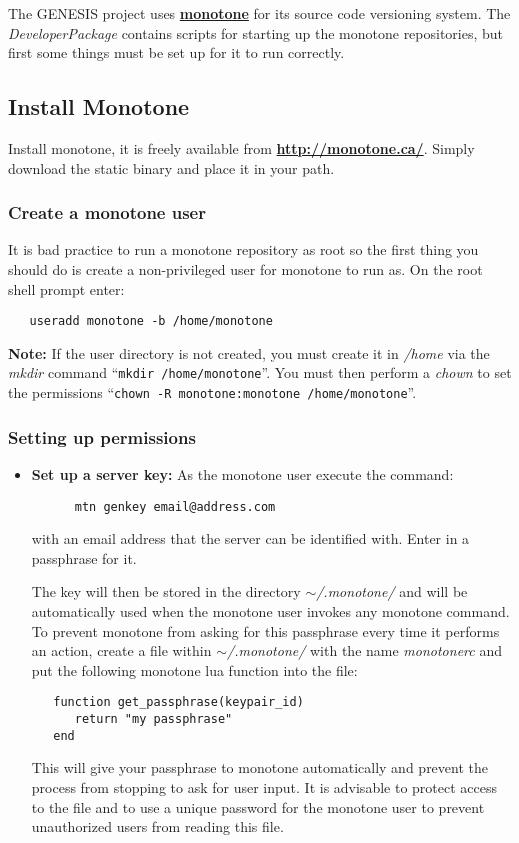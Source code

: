 \documentclass[12pt]{article}
\begin{document}
The GENESIS project uses \href{http://www.monotone.ca/}{\bf monotone} for its source code versioning system. The {\it DeveloperPackage} contains scripts for starting up the monotone repositories, but first some things must be set up for it to run correctly.

\subsection*{Install Monotone}

Install monotone, it is freely available from \href{http://monotone.ca/}{\bf http://monotone.ca/}. Simply download the static binary and place it in your path.

\subsubsection*{Create a monotone user}

It is bad practice to run a monotone repository as root so the first thing you should do is create a non-privileged user for monotone to run as. On the root shell prompt enter:
\begin{verbatim}
   useradd monotone -b /home/monotone
\end{verbatim}
{\bf Note:} If the user directory is not created, you must create it in  {\it /home} via the {\it mkdir} command ``{\tt mkdir /home/monotone}''. You must then perform a {\it chown} to set the permissions ``{\tt chown -R monotone:monotone /home/monotone}''.

\subsubsection*{Setting up permissions}

\begin{itemize}
   \item[]{\bf Set up a server key:} As the monotone user execute the command:
   \begin{verbatim}
      mtn genkey email@address.com
   \end{verbatim}
with an email address that the server can be identified with. Enter in a passphrase for it.

The key will then be stored in the directory {\it $\sim$/.monotone/}
and will be automatically used when the monotone user invokes any
monotone command. To prevent monotone from asking for this passphrase
every time it performs an action, create a file within {\it
  $\sim$/.monotone/} with the name {\it monotonerc} and put the
following monotone lua function into the file:
\begin{verbatim}
   function get_passphrase(keypair_id)
      return "my passphrase"
   end
\end{verbatim}
This will give your passphrase to monotone automatically and prevent
the process from stopping to ask for user input. It is advisable to
protect access to the file and to use a unique password for the
monotone user to prevent unauthorized users from reading this file.
\end{itemize}
\end{document}
